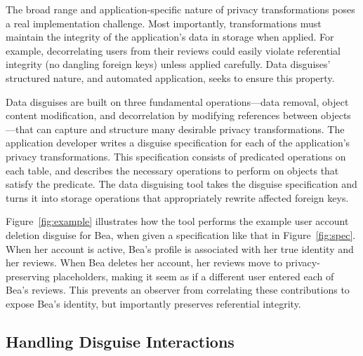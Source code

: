 %
The broad range and application-specific nature of privacy transformations poses a real
implementation challenge.
%
Most importantly, transformations must maintain the integrity of the application's data
in storage when applied.
%
For example, decorrelating users from their reviews could easily violate referential
integrity (\ie no dangling foreign keys) unless applied carefully.
%
%
Data disguises' structured nature, and automated application, seeks to ensure this
property.
%

%
Data disguises are built on three fundamental operations---data removal, object content
modification, and decorrelation by modifying references between objects---that can
capture and structure many desirable privacy transformations.
%
The application developer writes a disguise specification for each of the application's
privacy transformations.
%
This specification consists of predicated operations on each table, and describes
the necessary operations to perform on objects that satisfy the predicate.
%
The data disguising tool takes the disguise specification and turns it into storage
operations that appropriately rewrite affected foreign keys.
%

%
Figure~\ref{fig:example} illustrates how the tool performs the example user
account deletion disguise for Bea, when given a specification like that in Figure~\ref{fig:spec}.
%
When her account is active, Bea's profile is associated with her true identity and her
reviews.
%
When Bea deletes her account, her reviews move to privacy-preserving
placeholders, making it seem as if a different user entered each of Bea's reviews.
%
This prevents an observer from correlating these contributions to expose Bea's identity,
but importantly preserves referential integrity.
%

%
%
%

\subsection{Handling Disguise Interactions}


